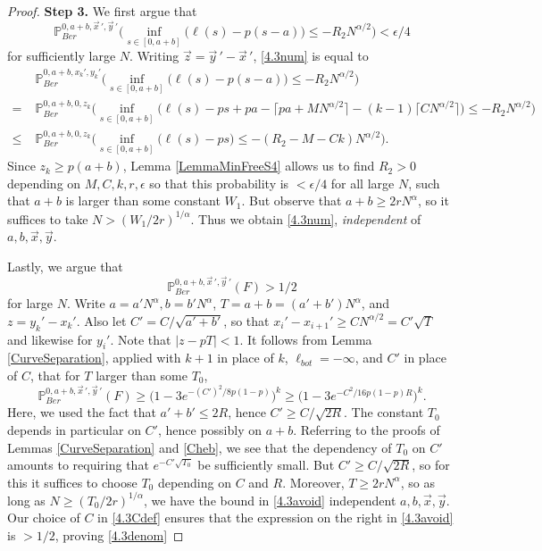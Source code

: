 \begin{proof}
		\noindent\textbf{Step 3.} We first argue that
		\begin{equation}\label{4.3num}
		\mathbb{P}^{0, a+b, \vec{x}\,', \vec{y}\,'}_{Ber} \Big( \inf_{s\in[0,a+b]} \big(\ell(s) - p(s-a)\big) \leq -R_2 N^{\alpha/2} \Big) < \epsilon/4
		\end{equation}
		for sufficiently large $N$. Writing $\vec{z} = \vec{y}\,' - \vec{x}\,'$, \eqref{4.3num} is equal to
		\begin{align}
		& \mathbb{P}^{0, a+b, x_k', y_k'}_{Ber} \Big( \inf_{s\in[0,a+b]} \big(\ell(s) - p(s-a)\big) \leq -R_2 N^{\alpha/2} \Big) \nonumber\\
		= \; & \mathbb{P}^{0, a+b, 0, z_k}_{Ber} \Big( \inf_{s\in[0,a+b]} \big(\ell(s) - ps + pa - \lceil pa + MN^{\alpha/2}\rceil - (k-1)\lceil CN^{\alpha/2}\rceil\big) \leq -R_2 N^{\alpha/2} \Big) \nonumber\\
		\leq \; & \mathbb{P}^{0, a+b, 0, z_k}_{Ber} \Big( \inf_{s\in[0,a+b]} \big(\ell(s) - ps\big) \leq -(R_2 - M - Ck) N^{\alpha/2} \Big).\label{4.3R2}
		\end{align}
		Since $z_k\geq p(a+b)$, Lemma \ref{LemmaMinFreeS4} allows us to find $R_2>0$ depending on $M,C,k,r,\epsilon$ so that this probability is $<\epsilon/4$ for all large $N$, such that $a+b$ is larger than some constant $W_1$. But observe that $a+b \geq 2rN^\alpha$, so it suffices to take $N > (W_1/2r)^{1/\alpha}$. Thus we obtain \eqref{4.3num}, \textit{independent} of $a,b,\vec{x},\vec{y}$.
		
		Lastly, we argue that
		\begin{equation}\label{4.3denom}
		\mathbb{P}^{0, a+b, \vec{x}\,', \vec{y}\,'}_{Ber}(F) > 1/2
		\end{equation}
		for large $N$. Write $a = a'N^\alpha, b = b'N^\alpha$, $T = a+b = (a'+b')N^\alpha$, and $z = y_k' - x_k'$. Also let $C' = C/\sqrt{a'+b'}$, so that $x_i' - x_{i+1}' \geq CN^{\alpha/2} = C'\sqrt{T}$ and likewise for $y_i'$. Note that $|z-pT| < 1$. It follows from Lemma \ref{CurveSeparation}, applied with $k+1$ in place of $k$, $\ell_{bot} = -\infty$, and $C'$ in place of $C$, that for $T$ larger than some $T_0$, 
		\begin{equation}\label{4.3avoid}
		\mathbb{P}^{0, a+b, \vec{x}\,', \vec{y}\,'}_{Ber}(F) \geq \big(1 - 3e^{-(C')^2/8p(1-p)}\big)^k \geq \big(1 - 3e^{-C^2/16p(1-p)R}\big)^k.
		\end{equation}
		Here, we used the fact that $a'+b' \leq 2R$, hence $C' \geq C/\sqrt{2R}$. The constant $T_0$ depends in particular on $C'$, hence possibly on $a+b$. Referring to the proofs of Lemmas \ref{CurveSeparation} and \ref{Cheb}, we see that the dependency of $T_0$ on $C'$ amounts to requiring that $e^{-C'\sqrt{T_0}}$ be sufficiently small. But $C' \geq C/\sqrt{2R}$, so for this it suffices to choose $T_0$ depending on $C$ and $R$. Moreover, $T\geq 2rN^\alpha$, so as long as $N \geq (T_0/2r)^{1/\alpha}$, we have the bound in \eqref{4.3avoid} independent $a,b,\vec{x},\vec{y}$. Our choice of $C$ in \eqref{4.3Cdef} ensures that the expression on the right in \eqref{4.3avoid} is $> 1/2$, proving \eqref{4.3denom}
		
	\end{proof}
	
